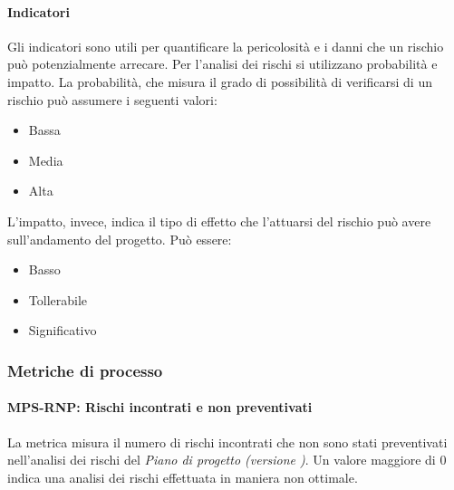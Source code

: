 \documentclass[../../norme-di-progetto.tex]{subfiles}
\begin{document}
\paragraph{Indicatori}%
\label{par:indicatori}

Gli indicatori sono utili per quantificare la pericolosità e i danni che un rischio può potenzialmente arrecare. Per l'analisi dei rischi si utilizzano probabilità e impatto. La probabilità, che misura il grado di possibilità di verificarsi di un rischio può assumere i seguenti valori:
\begin{itemize}
  \item Bassa
  \item Media
  \item Alta
\end{itemize}
L'impatto, invece, indica il tipo di effetto che l'attuarsi del rischio può avere sull'andamento del progetto. Può essere:
\begin{itemize}
  \item Basso
  \item Tollerabile
  \item Significativo
\end{itemize}

\subsubsection{Metriche di processo}%
\label{subs:gestione_dei_rischi/metriche_di_processo}

\paragraph{MPS-RNP: Rischi incontrati e non preventivati}%
\label{par:MPS-RNP_rischi_incontrati_e_non_preventivati}

La metrica misura il numero di rischi incontrati che non sono stati preventivati nell'analisi dei rischi del \textit{Piano di progetto (versione \versione)}. Un valore maggiore di 0 indica una analisi dei rischi effettuata in maniera non ottimale.
\end{document}
